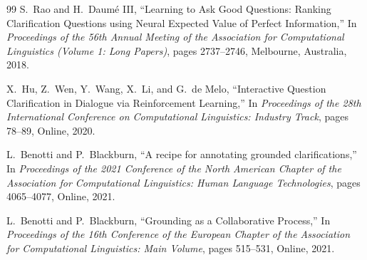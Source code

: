 \documentclass[11pt]{article}
\begin{document}
\begin{thebibliography}{99}
S.~Rao and H.~Daum{\'e} III,
\newblock ``Learning to Ask Good Questions: Ranking Clarification Questions using Neural Expected Value of Perfect Information,''
\newblock In \emph{Proceedings of the 56th Annual Meeting of the Association for Computational Linguistics (Volume 1: Long Papers)}, pages 2737--2746, Melbourne, Australia, 2018.

X.~Hu, Z.~Wen, Y.~Wang, X.~Li, and G.~de Melo,
\newblock ``Interactive Question Clarification in Dialogue via Reinforcement Learning,''
\newblock In \emph{Proceedings of the 28th International Conference on Computational Linguistics: Industry Track}, pages 78--89, Online, 2020.

L.~Benotti and P.~Blackburn,
\newblock ``A recipe for annotating grounded clarifications,''
\newblock In \emph{Proceedings of the 2021 Conference of the North American Chapter of the Association for Computational Linguistics: Human Language Technologies}, pages 4065--4077, Online, 2021.

L.~Benotti and P.~Blackburn,
\newblock ``Grounding as a Collaborative Process,''
\newblock In \emph{Proceedings of the 16th Conference of the European Chapter of the Association for Computational Linguistics: Main Volume}, pages 515--531, Online, 2021.

\end{thebibliography}
\end{document}

